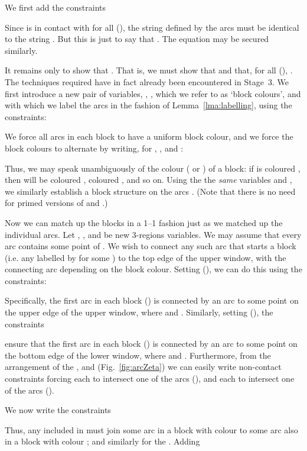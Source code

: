\documentclass{article}
\begin{document}
We first add the constraints

Since  is in contact with  for all  (), the string  defined by the arcs 
must be identical to the string . But this is just to say that .
The equation  may be secured similarly.

It remains only to show that .  That is, we must show
that  and that, for all  (), . The techniques required have in fact already been encountered
in Stage~3.  We first introduce a new pair of variables, , ,
which we refer to as `block colours', and with which we label the arcs
 in the fashion of Lemma~\ref{lma:labelling}, using the
constraints:

We force all arcs in each block  to have a uniform block colour,
and we force the block colours to alternate by writing, for ,
,  and :

Thus, we may speak unambiguously of the colour ( or ) of a
block: if  is coloured , then  will be coloured ,
 coloured , and so on.  Using the the {\em same} variables
 and , we similarly establish a block structure  on the arcs . (Note that there is no need
for primed versions of  and .)

Now we can match up the blocks in a 1--1
fashion just as we matched up the individual arcs. Let ,
,  and  be new 3-regions
variables.  We may assume that every arc  contains some point
of . We wish to connect any such arc that
starts a block  (i.e. any  labelled by  for
some ) to the top edge of the upper window, with the connecting arc
depending on the block colour.  Setting  (), we can do this using the
constraints:

Specifically, the first arc in each block  () is
connected by an arc  to some point on the
upper edge of the upper window, where 
and .  Similarly, setting
 (), 
the constraints

ensure that the first arc in each block  () is connected by an arc  to some
point on the bottom edge of the lower window, where  and .
Furthermore, from the arrangement of the ,
 and  (Fig.~\ref{fig:arcZeta}) we can easily write
non-contact constraints
forcing each  to intersect one of the arcs  (), and each  to intersect one of the arcs
 ().

We now write the constraints

Thus, any  included in  must join some arc  in
a block with colour  to some arc  also in a block
with colour ; and similarly for the .
Adding
\end{document}
